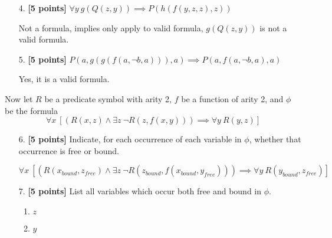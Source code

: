 \documentclass{article}
\begin{document}
\begin{enumerate}
\item[4.] \textbf{[5 points]}
  $\forall y\ g(Q(z,y)) \implies P(h(f(y,z,z),z))$
  
  \begin{answer}
    Not a formula, implies only apply to valid formula, $g(Q(z,y))$ is not a valid formula.
  \end{answer}
\end{enumerate}

\begin{enumerate}
\item[5.] \textbf{[5 points]}
  $P(a,g(g(f(a,\neg b, a))),a) \implies P(a,f(a,\neg b, a),a)$
    
  \begin{answer}
    Yes, it is a valid formula.
  \end{answer}
\end{enumerate}

\noindent
Now let $R$ be a predicate symbol with arity 2, $f$ be a function of
arity 2, and $\phi$ be the formula
\begin{displaymath}
  \forall x\
  [(R(x,z) \land  \exists z\ \neg R(z,f(x,y)))
  \implies \forall y\ R(y,z)]
\end{displaymath}
  
\begin{enumerate}
\item[6.] \textbf{[5 points]} Indicate, for each occurrence of each
  variable in $\phi$, whether that occurrence is free or bound.

  \begin{answer}
    \begin{displaymath}
      \forall x\
      [(R(x_{bound},z_{free}) \land  \exists z\ \neg R(z_{bound},f(x_{bound},y_{free})))
      \implies \forall y\ R(y_{bound},z_{free})]
    \end{displaymath}
  \end{answer}
\end{enumerate}

\begin{enumerate}
\item[7.] \textbf{[5 points]} List all variables which occur both free and
  bound in $\phi$.
  \begin{answer}
    \begin{enumerate}
      \item $z$
      \item $y$
    \end{enumerate}
  \end{answer}
\end{enumerate}
\end{document}
